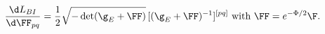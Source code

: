 \begin{equation}
\frac{\d L_{BI}}{\d\FF_{pq}} =
   \frac{1}{2} \sqrt{-\det(\g_E+\FF)}\,[(\g_E+\FF)^{-1}]^{[pq]}
\text{ with } \FF = e^{-\Phi/2}\F.
\end{equation}

